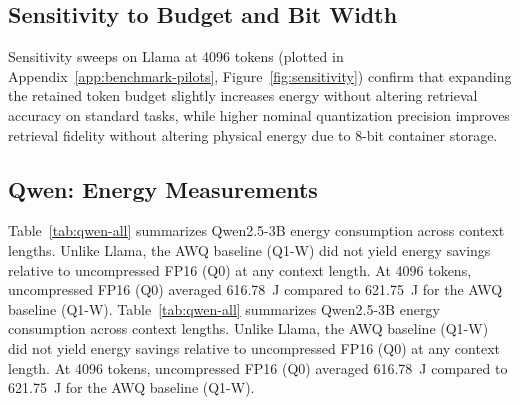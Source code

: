 \documentclass[sigconf,nonacm]{acmart}
\begin{document}
\subsection{Sensitivity to Budget and Bit Width}

Sensitivity sweeps on Llama at 4096 tokens (plotted in Appendix~\ref{app:benchmark-pilots}, Figure~\ref{fig:sensitivity}) confirm that expanding the retained token budget slightly increases energy without altering retrieval accuracy on standard tasks, while higher nominal quantization precision improves retrieval fidelity without altering physical energy due to 8-bit container storage.

\subsection{Qwen: Energy Measurements}
\label{sec:qwen-energy}

Table~\ref{tab:qwen-all} summarizes Qwen2.5-3B energy consumption across context lengths. Unlike Llama, the AWQ baseline (Q1-W) did not yield energy savings relative to uncompressed FP16 (Q0) at any context length. At 4096 tokens, uncompressed FP16 (Q0) averaged 616.78~J compared to 621.75~J for the AWQ baseline (Q1-W).
Table~\ref{tab:qwen-all} summarizes Qwen2.5-3B energy consumption across context lengths. Unlike Llama, the AWQ baseline (Q1-W) did not yield energy savings relative to uncompressed FP16 (Q0) at any context length. At 4096 tokens, uncompressed FP16 (Q0) averaged 616.78~J compared to 621.75~J for the AWQ baseline (Q1-W).

\begin{table}[htbp]
\caption{Qwen Energy (J, mean $\pm$ SD) Across Contexts}
\label{tab:qwen-all}
\centering\small
{}
\end{table}
\end{document}
